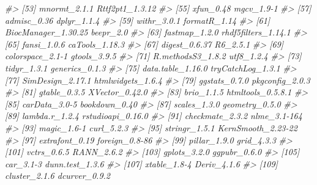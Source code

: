 \documentclass[]{article}
\newcommand{\hlcom}[1]{\textcolor[rgb]{0.502,0.502,0.502}{\textit{#1}}}%
\newenvironment{Shaded}{\begin{myshaded}}{\end{myshaded}}
\newcommand{\CommentTok}[1]{\hlcom{#1}}
\begin{document}
\begin{Shaded}
\begin{Highlighting}[]
\CommentTok{\#\textgreater{}  [53] mnormt\_2.1.1              Rttf2pt1\_1.3.12          }
\CommentTok{\#\textgreater{}  [55] xfun\_0.48                 mgcv\_1.9{-}1               }
\CommentTok{\#\textgreater{}  [57] admisc\_0.36               dplyr\_1.1.4              }
\CommentTok{\#\textgreater{}  [59] withr\_3.0.1               formatR\_1.14             }
\CommentTok{\#\textgreater{}  [61] BiocManager\_1.30.25       beepr\_2.0                }
\CommentTok{\#\textgreater{}  [63] fastmap\_1.2.0             rhdf5filters\_1.14.1      }
\CommentTok{\#\textgreater{}  [65] fansi\_1.0.6               caTools\_1.18.3           }
\CommentTok{\#\textgreater{}  [67] digest\_0.6.37             R6\_2.5.1                 }
\CommentTok{\#\textgreater{}  [69] colorspace\_2.1{-}1          gtools\_3.9.5             }
\CommentTok{\#\textgreater{}  [71] R.methodsS3\_1.8.2         utf8\_1.2.4               }
\CommentTok{\#\textgreater{}  [73] tidyr\_1.3.1               generics\_0.1.3           }
\CommentTok{\#\textgreater{}  [75] data.table\_1.16.0         tryCatchLog\_1.3.1        }
\CommentTok{\#\textgreater{}  [77] SimDesign\_2.17.1          htmlwidgets\_1.6.4        }
\CommentTok{\#\textgreater{}  [79] ggstats\_0.7.0             pkgconfig\_2.0.3          }
\CommentTok{\#\textgreater{}  [81] gtable\_0.3.5              XVector\_0.42.0           }
\CommentTok{\#\textgreater{}  [83] brio\_1.1.5                htmltools\_0.5.8.1        }
\CommentTok{\#\textgreater{}  [85] carData\_3.0{-}5             bookdown\_0.40            }
\CommentTok{\#\textgreater{}  [87] scales\_1.3.0              geometry\_0.5.0           }
\CommentTok{\#\textgreater{}  [89] lambda.r\_1.2.4            rstudioapi\_0.16.0        }
\CommentTok{\#\textgreater{}  [91] checkmate\_2.3.2           nlme\_3.1{-}164             }
\CommentTok{\#\textgreater{}  [93] magic\_1.6{-}1               curl\_5.2.3               }
\CommentTok{\#\textgreater{}  [95] stringr\_1.5.1             KernSmooth\_2.23{-}22       }
\CommentTok{\#\textgreater{}  [97] extrafont\_0.19            foreign\_0.8{-}86           }
\CommentTok{\#\textgreater{}  [99] pillar\_1.9.0              grid\_4.3.3               }
\CommentTok{\#\textgreater{} [101] vctrs\_0.6.5               RANN\_2.6.2               }
\CommentTok{\#\textgreater{} [103] gplots\_3.2.0              ggpubr\_0.6.0             }
\CommentTok{\#\textgreater{} [105] car\_3.1{-}3                 dunn.test\_1.3.6          }
\CommentTok{\#\textgreater{} [107] xtable\_1.8{-}4              Deriv\_4.1.6              }
\CommentTok{\#\textgreater{} [109] cluster\_2.1.6             dcurver\_0.9.2            }

\end{Highlighting}
\end{Shaded}
\end{document}
